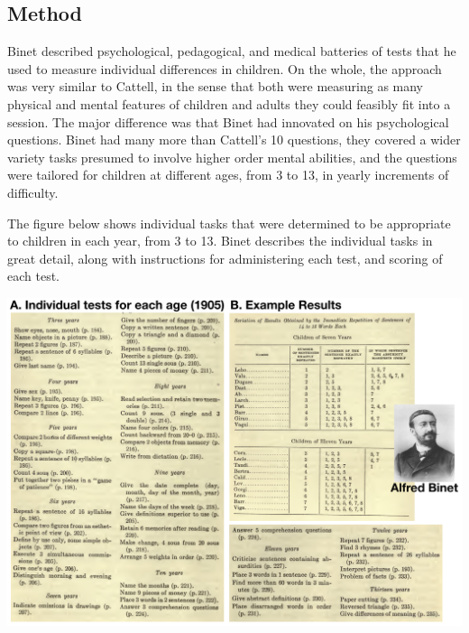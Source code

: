 \documentclass[
  oneside,
  12pt]{crumpbook}
\begin{document}
\hypertarget{method}{%
\subsection{Method}\label{method}}

Binet described psychological, pedagogical, and medical batteries of tests that he used to measure individual differences in children. On the whole, the approach was very similar to Cattell, in the sense that both were measuring as many physical and mental features of children and adults they could feasibly fit into a session. The major difference was that Binet had innovated on his psychological questions. Binet had many more than Cattell's 10 questions, they covered a wider variety tasks presumed to involve higher order mental abilities, and the questions were tailored for children at different ages, from 3 to 13, in yearly increments of difficulty.

The figure below shows individual tasks that were determined to be appropriate to children in each year, from 3 to 13. Binet describes the individual tasks in great detail, along with instructions for administering each test, and scoring of each test.

\includegraphics[width=1\linewidth]{imgs/Binet_1905}
\end{document}
